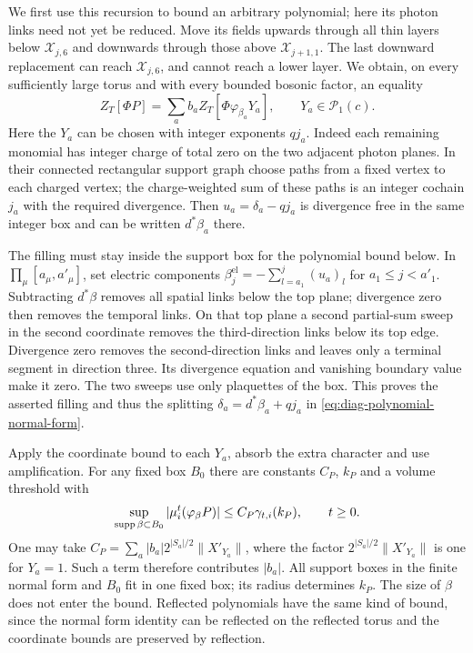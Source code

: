 We first use this recursion to bound an arbitrary polynomial;
here its photon links need not yet be reduced. Move its fields
upwards through all thin layers below $\mathcal X_{j,6}$ and
downwards through those above $\mathcal X_{j+1,1}$. The last
downward replacement can reach $\mathcal X_{j,6}$, and cannot
reach a lower layer. We obtain, on every sufficiently large
torus and with every bounded bosonic factor, an equality
\begin{equation}\label{eq:diag-polynomial-normal-form}
 Z_T[\Phi P]=\sum_a b_a Z_T[\Phi\varphi_{\beta_a}Y_a],
 \qquad Y_a\in\mathcal P_1(c).
\end{equation}
Here the $Y_a$ can be chosen with integer exponents $qj_a$.
Indeed each remaining monomial has integer charge of total
zero on the two adjacent photon planes. In their connected
rectangular support graph choose paths from a fixed vertex
to each charged vertex; the charge-weighted sum of these
paths is an integer cochain $j_a$ with the required divergence.
Then $u_a=\delta_a-qj_a$ is divergence free in the same
integer box and can be written $d^*\beta_a$ there.

The filling must stay inside the support box for the polynomial
bound below. In
$\prod_\mu[a_\mu,a'_\mu]$, set electric components
$\beta_j^{\mathrm{el}}=-\sum_{l=a_1}^j(u_a)_l$ for
$a_1\le j<a'_1$. Subtracting $d^*\beta$ removes all spatial
links below the top plane; divergence zero then removes
the temporal links. On that top plane a second partial-sum
sweep in the second coordinate removes the third-direction
links below its top edge. Divergence zero removes the
second-direction links and leaves only a terminal segment
in direction three. Its divergence equation and vanishing
boundary value make it zero. The two sweeps use only
plaquettes of the box. This proves the asserted filling
and thus the splitting $\delta_a=d^*\beta_a+qj_a$ in
\eqref{eq:diag-polynomial-normal-form}.

Apply the coordinate bound to each $Y_a$, absorb the extra
character and use amplification. For any fixed box $B_0$
there are constants $C_P$, $k_P$ and a volume threshold with
\begin{equation}\label{eq:diag-polynomial-apriori}
 \sup_{\operatorname{supp}\beta\subset B_0}
       |\mu_i^t(\varphi_\beta P)|
             \le C_P\gamma_{t,i}(k_P),\qquad t\ge0.
\end{equation}
One may take
$C_P=\sum_a|b_a|2^{|S_a|/2}\|X'_{Y_a}\|$, where the factor
$2^{|S_a|/2}\|X'_{Y_a}\|$ is one for $Y_a=1$. Such a term
therefore contributes $|b_a|$. All support boxes in the finite normal form
and $B_0$ fit in one fixed box; its radius determines $k_P$.
The size of $\beta$ does not enter the bound. Reflected
polynomials have the same kind of bound, since the normal
form identity can be reflected on the reflected torus and
the coordinate bounds are preserved by reflection.

